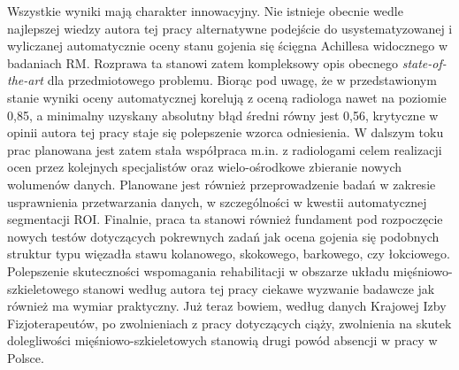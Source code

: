 Wszystkie wyniki mają charakter innowacyjny. Nie istnieje obecnie wedle najlepszej wiedzy autora tej pracy alternatywne podejście do usystematyzowanej i wyliczanej automatycznie oceny stanu gojenia się ścięgna Achillesa widocznego w badaniach RM. Rozprawa ta stanowi zatem kompleksowy opis obecnego \textit{state-of-the-art} dla przedmiotowego problemu. Biorąc pod uwagę, że w przedstawionym stanie wyniki oceny automatycznej korelują z oceną radiologa nawet na poziomie 0,85, a minimalny uzyskany absolutny błąd średni równy jest 0,56, krytyczne w opinii autora tej pracy staje się polepszenie wzorca odniesienia. W dalszym toku prac planowana jest zatem stała współpraca m.in. z radiologami celem realizacji ocen przez kolejnych specjalistów oraz wielo-ośrodkowe zbieranie nowych wolumenów danych. Planowane jest również przeprowadzenie badań w zakresie usprawnienia przetwarzania danych, w szczególności w kwestii automatycznej segmentacji ROI. Finalnie, praca ta stanowi również fundament pod rozpoczęcie nowych testów dotyczących pokrewnych zadań jak ocena gojenia się podobnych struktur typu więzadła stawu kolanowego, skokowego, barkowego, czy łokciowego. Polepszenie skuteczności wspomagania rehabilitacji w obszarze układu mięśniowo-szkieletowego stanowi według autora tej pracy ciekawe wyzwanie badawcze jak również ma wymiar praktyczny. Już teraz bowiem, według danych Krajowej Izby Fizjoterapeutów, po zwolnieniach z pracy dotyczących ciąży, zwolnienia na skutek dolegliwości mięśniowo-szkieletowych stanowią drugi powód absencji w pracy w Polsce.




